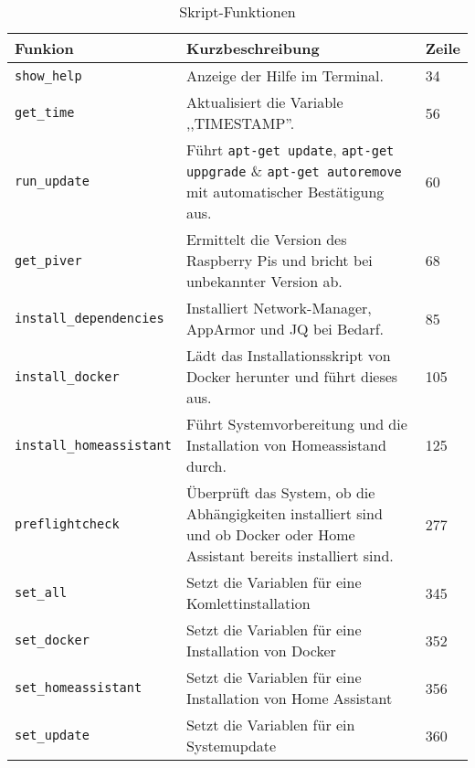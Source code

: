 \begin{table}[H]
\begin{tabularx}{\textwidth}{|p{4.7cm}|p{8cm}|p{1.5cm}|}
 	\hline 
 	\textbf{Funkion} & \textbf{Kurzbeschreibung} & \textbf{Zeile} \\ 
 	\hline 
 	\texttt{show\_help} & Anzeige der Hilfe im Terminal. & 34 \\ 
 	\hline 
 	\texttt{get\_time} & Aktualisiert die Variable ,,TIMESTAMP''. & 56 \\ 
 	\hline
 	\texttt{run\_update} & Führt \texttt{apt-get update}, \texttt{apt-get uppgrade} \& \texttt{apt-get autoremove} mit automatischer Bestätigung aus. & 60 \\ 
 	\hline
 	\texttt{get\_piver} & Ermittelt die Version des Raspberry Pis und bricht bei unbekannter Version ab. & 68 \\
 	\hline
 	\texttt{install\_dependencies} & Installiert Network-Manager, AppArmor und JQ bei Bedarf. & 85 \\ 
 	\hline 
 	\texttt{install\_docker} & Lädt das Installationsskript von Docker herunter und führt dieses aus. & 105 \\ 
 	\hline
 	\texttt{install\_homeassistant} & Führt Systemvorbereitung und die Installation von Homeassistand durch. & 125 \\
 	\hline
 	\texttt{preflightcheck} & Überprüft das System, ob die Abhängigkeiten installiert sind und ob Docker oder Home Assistant bereits installiert sind. & 277 \\ 
 	\hline
 	\texttt{set\_all} & Setzt die Variablen für eine Komlettinstallation & 345 \\ 
 	\hline
 	\texttt{set\_docker} & Setzt die Variablen für eine Installation von Docker & 352 \\ 
 	\hline
 	\texttt{set\_homeassistant} & Setzt die Variablen für eine Installation von Home Assistant & 356 \\
 	\hline
 	\texttt{set\_update} & Setzt die Variablen für ein Systemupdate & 360\\
 	\hline
\end{tabularx} 
    \caption[Skript-Funktionen]{Skript-Funktionen}
    \label{tab:Skript-Funktionen}
\end{table}